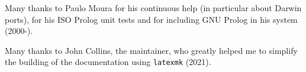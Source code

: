 Many thanks to Paulo Moura for his continuous help (in particular
about Darwin ports), for his ISO Prolog unit tests and for including
GNU Prolog in his  system (2000-).

Many thanks to John Collins, the
 maintainer, who greatly
helped me to simplify the building of the documentation using
\texttt{latexmk} (2021).


